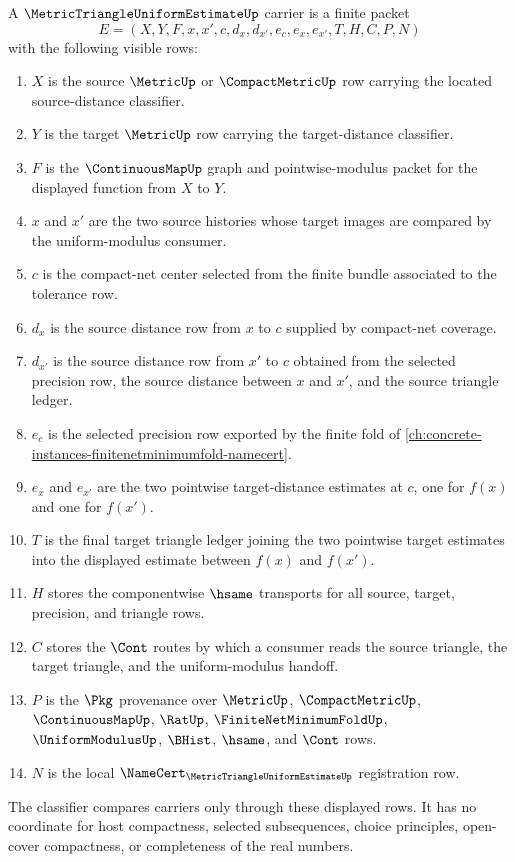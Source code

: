 \begin{definition}
\label{def:metric-triangle-uniform-estimate-carrier}
A $\MetricTriangleUniformEstimateUp$ carrier is a finite packet
$$
E=(X,Y,F,x,x',c,d_x,d_{x'},e_c,e_x,e_{x'},T,H,C,P,N)
$$
with the following visible rows:
\begin{enumerate}
\item $X$ is the source $\MetricUp$ or $\CompactMetricUp$ row carrying the located source-distance classifier.
\item $Y$ is the target $\MetricUp$ row carrying the target-distance classifier.
\item $F$ is the $\ContinuousMapUp$ graph and pointwise-modulus packet for the displayed function from $X$ to $Y$.
\item $x$ and $x'$ are the two source histories whose target images are compared by the uniform-modulus consumer.
\item $c$ is the compact-net center selected from the finite bundle associated to the tolerance row.
\item $d_x$ is the source distance row from $x$ to $c$ supplied by compact-net coverage.
\item $d_{x'}$ is the source distance row from $x'$ to $c$ obtained from the selected precision row, the source distance between $x$ and $x'$, and the source triangle ledger.
\item $e_c$ is the selected precision row exported by the finite fold of \autoref{ch:concrete-instances-finitenetminimumfold-namecert}.
\item $e_x$ and $e_{x'}$ are the two pointwise target-distance estimates at $c$, one for $f(x)$ and one for $f(x')$.
\item $T$ is the final target triangle ledger joining the two pointwise target estimates into the displayed estimate between $f(x)$ and $f(x')$.
\item $H$ stores the componentwise $\hsame$ transports for all source, target, precision, and triangle rows.
\item $C$ stores the $\Cont$ routes by which a consumer reads the source triangle, the target triangle, and the uniform-modulus handoff.
\item $P$ is the $\Pkg$ provenance over $\MetricUp$, $\CompactMetricUp$, $\ContinuousMapUp$, $\RatUp$, $\FiniteNetMinimumFoldUp$, $\UniformModulusUp$, $\BHist$, $\hsame$, and $\Cont$ rows.
\item $N$ is the local $\NameCert_{\MetricTriangleUniformEstimateUp}$ registration row.
\end{enumerate}
The classifier compares carriers only through these displayed rows. It has no coordinate for host compactness, selected subsequences, choice principles, open-cover compactness, or completeness of the real numbers.
\end{definition}

